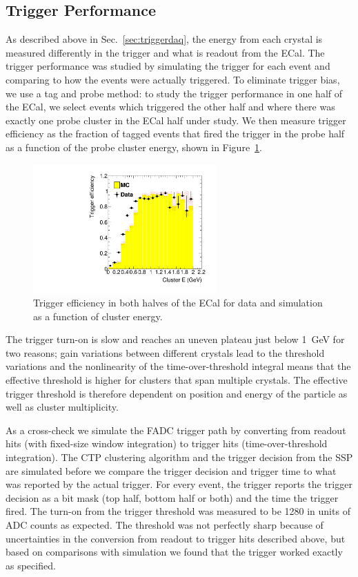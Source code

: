 \documentclass[final,3p,times,twocolumn]{elsarticle}
\begin{document}
\subsection{Trigger Performance}
As described above in Sec.~\ref{sec:triggerdaq}, the energy from each 
crystal is measured differently in the trigger and what is readout from the ECal. 
The trigger performance was studied by simulating the 
trigger for each event and comparing to how the events were actually triggered.
To eliminate trigger bias, we use a tag and probe method: to study the trigger performance in one half 
of the ECal, we select 
events which triggered the other half and where there was exactly one probe cluster in the ECal half 
under study. We then measure trigger efficiency as the fraction of tagged events that fired the trigger in 
the probe half as a function of the probe cluster energy, shown in Figure~\ref{fig:turnon}. 
\begin{figure}[ht]
\begin{center}
{\small
	\includegraphics[width=7cm]{figures/h_cl_E_probedata_eff_bay_h_cl_E_probeMC_eff_bay_dataMC_1351-v7-trig-tagBot.pdf}
	\caption{Trigger efficiency in both halves of the ECal for data and simulation as a 
	function of cluster energy.}
\label{fig:turnon}
}
\end{center}
\end{figure}
The trigger turn-on is slow and reaches an uneven plateau just below 1~GeV for two reasons;  
gain variations between different crystals lead to the threshold variations and the nonlinearity of 
the time-over-threshold integral means that the effective threshold is higher for clusters that span 
multiple crystals. The effective trigger threshold is therefore dependent on position and energy of 
the particle as well as cluster multiplicity. 

As a cross-check we simulate the FADC trigger path by converting from readout hits (with fixed-size 
window integration) to trigger hits (time-over-threshold integration). The CTP clustering 
algorithm and the trigger decision from the SSP are simulated before we compare the trigger decision 
and trigger time to what was reported by the actual trigger. For every event, the trigger reports the 
trigger decision as a bit mask (top half, bottom half or both) and the time the trigger fired.
The turn-on from the trigger threshold was measured to be 1280 in units of ADC counts as expected. 
The threshold was not perfectly sharp because of uncertainties in the conversion from readout to trigger 
hits described above, but based on comparisons with simulation we found that the 
trigger worked exactly as specified.
\end{document}
